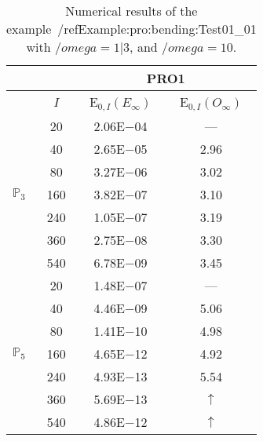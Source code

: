 \begin{table}[H]
\caption{Numerical results of the example~/ref{Example:pro:bending:Test01_01} with $/omega=1|3$, and $/omega=10$.}
\setlength{\tabcolsep}{5pt}
\centering
\begin{tabular}{@{}l c c c@{}}
\toprule
 &  & \multicolumn{2}{c}{PRO1}\\
\midrule
 & $I$ & E$_{0,I}(E_{\infty})$ & E$_{0,I}(O_{\infty})$\\
\midrule
\multirow{7}{*}{$\mathbb{P}_{3}$}
 & 20 & 2.06E$-$04 & ---\\
 & 40 & 2.65E$-$05 & 2.96\\
 & 80 & 3.27E$-$06 & 3.02\\
 & 160 & 3.82E$-$07 & 3.10\\
 & 240 & 1.05E$-$07 & 3.19\\
 & 360 & 2.75E$-$08 & 3.30\\
 & 540 & 6.78E$-$09 & 3.45\\
\midrule
\multirow{7}{*}{$\mathbb{P}_{5}$}
 & 20 & 1.48E$-$07 & ---\\
 & 40 & 4.46E$-$09 & 5.06\\
 & 80 & 1.41E$-$10 & 4.98\\
 & 160 & 4.65E$-$12 & 4.92\\
 & 240 & 4.93E$-$13 & 5.54\\
 & 360 & 5.69E$-$13 & $\uparrow$\\
 & 540 & 4.86E$-$12 & $\uparrow$\\
\bottomrule
\end{tabular}
\label{Table:pRO:test_01_01_test8_pro2}
\end{table}
